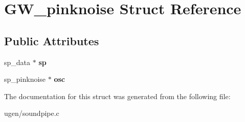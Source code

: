 \hypertarget{structGW__pinknoise}{}\section{G\+W\+\_\+pinknoise Struct Reference}
\label{structGW__pinknoise}
\subsection*{Public Attributes}
\begin{DoxyCompactItemize}
\item 
\hypertarget{structGW__pinknoise_a95daf57fb0994d27ad1038242d7421fe}{}\label{structGW__pinknoise_a95daf57fb0994d27ad1038242d7421fe} 
sp\+\_\+data $\ast$ {\bfseries sp}
\item 
\hypertarget{structGW__pinknoise_aa62e73a03b11c0e18172d8f28be93419}{}\label{structGW__pinknoise_aa62e73a03b11c0e18172d8f28be93419} 
sp\+\_\+pinknoise $\ast$ {\bfseries osc}
\end{DoxyCompactItemize}


The documentation for this struct was generated from the following file\+:\begin{DoxyCompactItemize}
\item 
ugen/soundpipe.\+c\end{DoxyCompactItemize}
